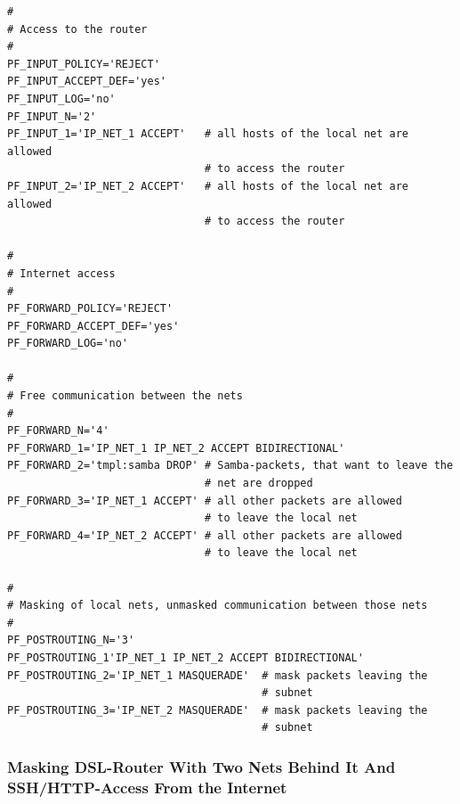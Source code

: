 \begin{example}
\begin{verbatim}
#
# Access to the router
#
PF_INPUT_POLICY='REJECT'
PF_INPUT_ACCEPT_DEF='yes'
PF_INPUT_LOG='no'
PF_INPUT_N='2'
PF_INPUT_1='IP_NET_1 ACCEPT'   # all hosts of the local net are allowed
                               # to access the router
PF_INPUT_2='IP_NET_2 ACCEPT'   # all hosts of the local net are allowed
                               # to access the router

#
# Internet access
#
PF_FORWARD_POLICY='REJECT'
PF_FORWARD_ACCEPT_DEF='yes'
PF_FORWARD_LOG='no'

#
# Free communication between the nets
#
PF_FORWARD_N='4'
PF_FORWARD_1='IP_NET_1 IP_NET_2 ACCEPT BIDIRECTIONAL'
PF_FORWARD_2='tmpl:samba DROP' # Samba-packets, that want to leave the
                               # net are dropped
PF_FORWARD_3='IP_NET_1 ACCEPT' # all other packets are allowed
                               # to leave the local net
PF_FORWARD_4='IP_NET_2 ACCEPT' # all other packets are allowed
                               # to leave the local net

#
# Masking of local nets, unmasked communication between those nets
#
PF_POSTROUTING_N='3'
PF_POSTROUTING_1'IP_NET_1 IP_NET_2 ACCEPT BIDIRECTIONAL'
PF_POSTROUTING_2='IP_NET_1 MASQUERADE'  # mask packets leaving the
                                        # subnet
PF_POSTROUTING_3='IP_NET_2 MASQUERADE'  # mask packets leaving the
                                        # subnet
\end{verbatim}
\end{example}

\subsubsection{Masking DSL-Router With Two Nets Behind It And SSH/HTTP-Access From the Internet}

